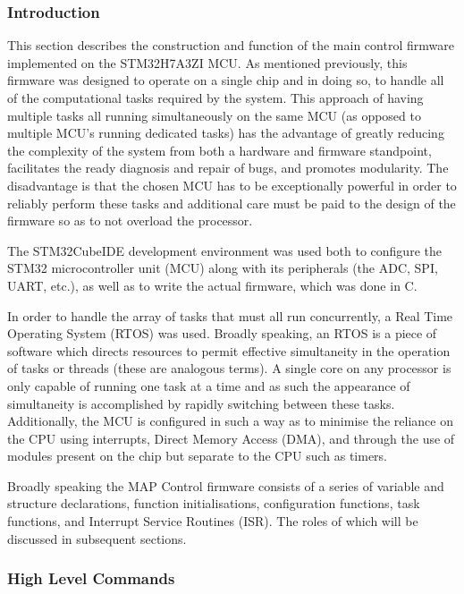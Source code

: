 \subsubsection{Introduction}

This section describes the construction and function of the main control firmware implemented on the STM32H7A3ZI MCU. As mentioned previously, this firmware was designed to operate on a single chip and in doing so, to handle all of the computational tasks required by the system. This approach of having multiple tasks all running simultaneously on the same MCU (as opposed to multiple MCU’s running dedicated tasks) has the advantage of greatly reducing the complexity of the system from both a hardware and firmware standpoint, facilitates the ready diagnosis and repair of bugs, and promotes modularity. The disadvantage is that the chosen MCU has to be exceptionally powerful in order to reliably perform these tasks and additional care must be paid to the design of the firmware so as to not overload the processor.

The STM32CubeIDE development environment was used both to configure the STM32 microcontroller unit (MCU) along with its peripherals (the ADC, SPI, UART, etc.), as well as to write the actual firmware, which was done in C.

In order to handle the array of tasks that must all run concurrently, a Real Time Operating System (RTOS) was used. Broadly speaking, an RTOS is a piece of software which directs resources to permit effective simultaneity in the operation of tasks or threads (these are analogous terms). A single core on any processor is only capable of running one task at a time and as such the appearance of simultaneity is accomplished by rapidly switching between these tasks. Additionally, the MCU is configured in such a way as to minimise the reliance on the CPU using interrupts, Direct Memory Access (DMA), and through the use of modules present on the chip but separate to the CPU such as timers.

Broadly speaking the MAP Control firmware consists of a series of variable and structure declarations, function initialisations, configuration functions, task functions, and Interrupt Service Routines (ISR). The roles of which will be discussed in subsequent sections.



\subsubsection{High Level Commands}

